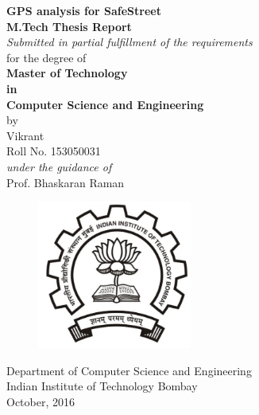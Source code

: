 \documentclass[12pt]{report}
\begin{document}
\begin{center}
  {\LARGE \textbf{GPS analysis for SafeStreet}}\\[0.3in]
  {\large \textbf{M.Tech Thesis Report}}\\[0.1in]
  {\large \textit{Submitted in partial fulfillment of the requirements}\\
    for the degree of}\\[0.1in]
  {\large \textbf{Master of Technology\\
      in\\
      Computer Science and Engineering}}\\[0.2in]
  \large by\\[0.1in]
  {\Large Vikrant\\Roll No. 153050031}\\[0.1in]

  \Large \textit{under the guidance of}\\[0.1in]
  {\Large Prof. Bhaskaran Raman}\\[0.08in]
  \begin{figure}[h]
    \centering
    \includegraphics[width=2in]{iitb-black}
  \end{figure}

  {\Large Department of Computer Science and Engineering\\[0.08in]
    Indian Institute of Technology Bombay\\[0.08in]
    October, 2016 }
\end{center}
\pagebreak
\end{document}
